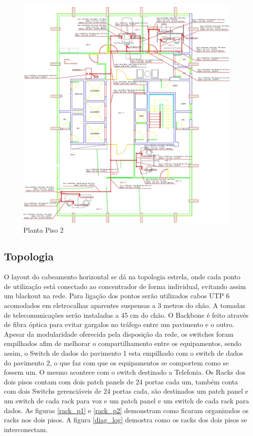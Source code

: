 \documentclass[	DIV=calc,%
							paper=a4,%
							fontsize=12pt,%
							onecolumn]{scrartcl}	 					%
\begin{document}
\begin{figure}
	\centering
	\includegraphics[width=\textwidth]{planta_p2}
	\caption{Planta Piso 2}
	\label{planta_p2}
\end{figure}
\FloatBarrier

\subsection{Topologia}
O layout do cabeamento horizontal se dá na topologia estrela, onde cada ponto de utilização está conectado ao concentrador de forma individual, evitando assim um blackout na rede. Para ligação dos pontos serão utilizados cabos UTP 6 acomodados em eletrocalhas aparentes suspensas a 3 metros do chão. A tomadas de telecomunicações serão instaladas a 45 cm do chão.
O Backbone é feito através de fibra óptica para evitar gargalos no tráfego entre um pavimento e o outro. Apesar da modularidade oferecida pela disposição da rede, os switches foram empilhados afim de melhorar o compartilhamento entre os equipamentos, sendo assim, o Switch de dados do pavimento 1 esta empilhado com o switch de dados do pavimento 2, o que faz com que os equipamentos se comportem como se fossem um. O mesmo acontece com o switch destinado a Telefonia.
Os Racks dos dois pisos contam com dois patch panels de 24 portas cada um, também conta com dois Switchs gerenciáveis de 24 portas cada, são destinados um patch panel e um switch de cada rack para voz e um patch panel e um switch de cada rack para dados.
As figuras \ref{rack_p1} e \ref{rack_p2} demonstram como ficaram organizados os racks nos dois pisos.\newline
A figura \ref{diag_log} demostra como os racks dos dois pisos se interconectam.
\end{document}
